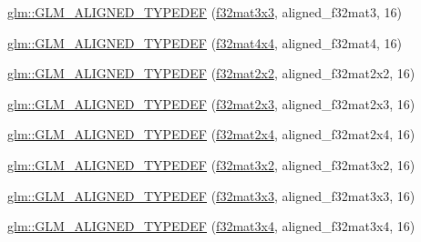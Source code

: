 \begin{DoxyCompactItemize}
\item 
\mbox{\hyperlink{group__gtx__type__aligned_gadd8ddbe2bf65ccede865ba2f510176dc}{glm\+::\+G\+L\+M\+\_\+\+A\+L\+I\+G\+N\+E\+D\+\_\+\+T\+Y\+P\+E\+D\+EF}} (\mbox{\hyperlink{group__gtc__type__precision_ga177c076d6d9aea27a5ae87b52607e57a}{f32mat3x3}}, aligned\+\_\+f32mat3, 16)
\item 
\mbox{\hyperlink{group__gtx__type__aligned_gaf18dbff14bf13d3ff540c517659ec045}{glm\+::\+G\+L\+M\+\_\+\+A\+L\+I\+G\+N\+E\+D\+\_\+\+T\+Y\+P\+E\+D\+EF}} (\mbox{\hyperlink{group__gtc__type__precision_ga2ba95a5c37eef05b26ac10e03daa5c84}{f32mat4x4}}, aligned\+\_\+f32mat4, 16)
\item 
\mbox{\hyperlink{group__gtx__type__aligned_ga66339f6139bf7ff19e245beb33f61cc8}{glm\+::\+G\+L\+M\+\_\+\+A\+L\+I\+G\+N\+E\+D\+\_\+\+T\+Y\+P\+E\+D\+EF}} (\mbox{\hyperlink{group__gtc__type__precision_ga3c0ffd3a47ae47ff05d5ea6e90825caa}{f32mat2x2}}, aligned\+\_\+f32mat2x2, 16)
\item 
\mbox{\hyperlink{group__gtx__type__aligned_ga1558a48b3934011b52612809f443e46d}{glm\+::\+G\+L\+M\+\_\+\+A\+L\+I\+G\+N\+E\+D\+\_\+\+T\+Y\+P\+E\+D\+EF}} (\mbox{\hyperlink{group__gtc__type__precision_ga1f5a1129669d427f5fbc5f02ff52c366}{f32mat2x3}}, aligned\+\_\+f32mat2x3, 16)
\item 
\mbox{\hyperlink{group__gtx__type__aligned_gaa52e5732daa62851627021ad551c7680}{glm\+::\+G\+L\+M\+\_\+\+A\+L\+I\+G\+N\+E\+D\+\_\+\+T\+Y\+P\+E\+D\+EF}} (\mbox{\hyperlink{group__gtc__type__precision_ga56deb277c1d5c1f42a80982372b4ed6c}{f32mat2x4}}, aligned\+\_\+f32mat2x4, 16)
\item 
\mbox{\hyperlink{group__gtx__type__aligned_gac09663c42566bcb58d23c6781ac4e85a}{glm\+::\+G\+L\+M\+\_\+\+A\+L\+I\+G\+N\+E\+D\+\_\+\+T\+Y\+P\+E\+D\+EF}} (\mbox{\hyperlink{group__gtc__type__precision_ga924b933089d954df062aa8d0735fc005}{f32mat3x2}}, aligned\+\_\+f32mat3x2, 16)
\item 
\mbox{\hyperlink{group__gtx__type__aligned_ga3f510999e59e1b309113e1d561162b29}{glm\+::\+G\+L\+M\+\_\+\+A\+L\+I\+G\+N\+E\+D\+\_\+\+T\+Y\+P\+E\+D\+EF}} (\mbox{\hyperlink{group__gtc__type__precision_ga177c076d6d9aea27a5ae87b52607e57a}{f32mat3x3}}, aligned\+\_\+f32mat3x3, 16)
\item 
\mbox{\hyperlink{group__gtx__type__aligned_ga2c9c94f0c89cd71ce56551db6cf4aaec}{glm\+::\+G\+L\+M\+\_\+\+A\+L\+I\+G\+N\+E\+D\+\_\+\+T\+Y\+P\+E\+D\+EF}} (\mbox{\hyperlink{group__gtc__type__precision_ga8459d79e94eb107e31f0ee600e9bae3f}{f32mat3x4}}, aligned\+\_\+f32mat3x4, 16)
\item 

\end{DoxyCompactItemize}
